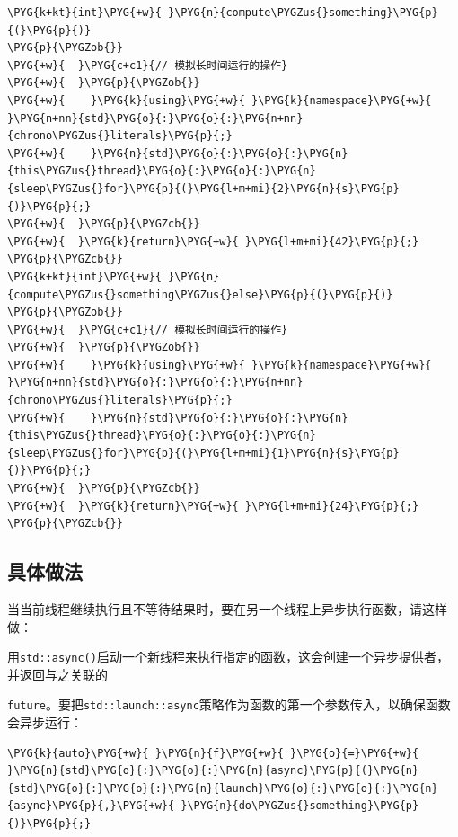 \begin{codeblockbg}
\begin{Verbatim}[commandchars=\\\{\},breaklines=true,breakanywhere=true,fontsize=\codefont,xleftmargin=17bp]
\PYG{k+kt}{int}\PYG{+w}{ }\PYG{n}{compute\PYGZus{}something}\PYG{p}{(}\PYG{p}{)}
\PYG{p}{\PYGZob{}}
\PYG{+w}{  }\PYG{c+c1}{// 模拟长时间运行的操作}
\PYG{+w}{  }\PYG{p}{\PYGZob{}}
\PYG{+w}{    }\PYG{k}{using}\PYG{+w}{ }\PYG{k}{namespace}\PYG{+w}{ }\PYG{n+nn}{std}\PYG{o}{:}\PYG{o}{:}\PYG{n+nn}{chrono\PYGZus{}literals}\PYG{p}{;}
\PYG{+w}{    }\PYG{n}{std}\PYG{o}{:}\PYG{o}{:}\PYG{n}{this\PYGZus{}thread}\PYG{o}{:}\PYG{o}{:}\PYG{n}{sleep\PYGZus{}for}\PYG{p}{(}\PYG{l+m+mi}{2}\PYG{n}{s}\PYG{p}{)}\PYG{p}{;}
\PYG{+w}{  }\PYG{p}{\PYGZcb{}}
\PYG{+w}{  }\PYG{k}{return}\PYG{+w}{ }\PYG{l+m+mi}{42}\PYG{p}{;}
\PYG{p}{\PYGZcb{}}
\PYG{k+kt}{int}\PYG{+w}{ }\PYG{n}{compute\PYGZus{}something\PYGZus{}else}\PYG{p}{(}\PYG{p}{)}
\PYG{p}{\PYGZob{}}
\PYG{+w}{  }\PYG{c+c1}{// 模拟长时间运行的操作}
\PYG{+w}{  }\PYG{p}{\PYGZob{}}
\PYG{+w}{    }\PYG{k}{using}\PYG{+w}{ }\PYG{k}{namespace}\PYG{+w}{ }\PYG{n+nn}{std}\PYG{o}{:}\PYG{o}{:}\PYG{n+nn}{chrono\PYGZus{}literals}\PYG{p}{;}
\PYG{+w}{    }\PYG{n}{std}\PYG{o}{:}\PYG{o}{:}\PYG{n}{this\PYGZus{}thread}\PYG{o}{:}\PYG{o}{:}\PYG{n}{sleep\PYGZus{}for}\PYG{p}{(}\PYG{l+m+mi}{1}\PYG{n}{s}\PYG{p}{)}\PYG{p}{;}
\PYG{+w}{  }\PYG{p}{\PYGZcb{}}
\PYG{+w}{  }\PYG{k}{return}\PYG{+w}{ }\PYG{l+m+mi}{24}\PYG{p}{;}
\PYG{p}{\PYGZcb{}}
\end{Verbatim}
\end{codeblockbg}



\subsection{具体做法}



当当前线程继续执行且不等待结果时，要在另一个线程上异步执行函数，请这样做：



用\texttt{std::\allowbreak{}async()}启动一个新线程来执行指定的函数，这会创建一个异步提供者，并返回与之关联的



\texttt{future}。要把\texttt{std::\allowbreak{}launch::\allowbreak{}async}策略作为函数的第一个参数传入，以确保函数会异步运行：



\begin{codeblockbg}
\begin{Verbatim}[commandchars=\\\{\},breaklines=true,breakanywhere=true,fontsize=\codefont,xleftmargin=17bp]
\PYG{k}{auto}\PYG{+w}{ }\PYG{n}{f}\PYG{+w}{ }\PYG{o}{=}\PYG{+w}{ }\PYG{n}{std}\PYG{o}{:}\PYG{o}{:}\PYG{n}{async}\PYG{p}{(}\PYG{n}{std}\PYG{o}{:}\PYG{o}{:}\PYG{n}{launch}\PYG{o}{:}\PYG{o}{:}\PYG{n}{async}\PYG{p}{,}\PYG{+w}{ }\PYG{n}{do\PYGZus{}something}\PYG{p}{)}\PYG{p}{;}
\end{Verbatim}
\end{codeblockbg}


